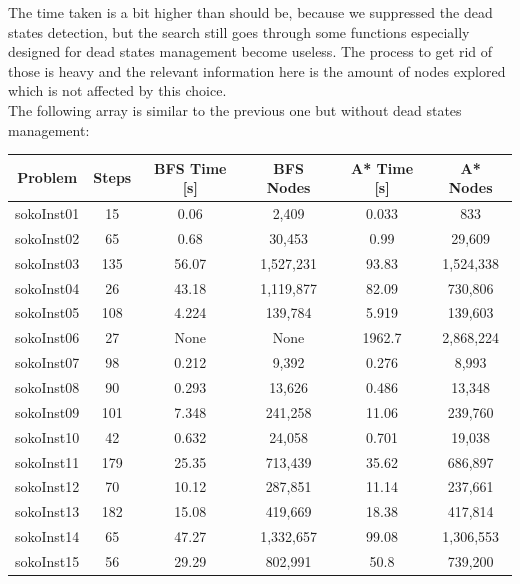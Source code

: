 \documentclass[a4paper,10pt]{article}
\begin{document}
			The time taken is a bit higher than should be, because we suppressed the dead states detection, but the search still goes through some functions especially designed for dead states management become useless. The process to get rid of those is heavy and the relevant information here is the amount of nodes explored which is not affected by this choice.\\
			The following array is similar to the previous one but without dead states management:\\
			
			\begin{tabular}{|c||c||c|c||c|c|}
				\hline 
				\textbf{Problem} & \textbf{Steps} & \textbf{BFS Time [s]} & \textbf{BFS Nodes} & \textbf{A* Time [s]} & \textbf{A* Nodes} \\ 
				\hline 
				sokoInst01 & 15 & 0.06 & 2,409 & 0.033 & 833 \\ 
				\hline
				sokoInst02 & 65 & 0.68 & 30,453 & 0.99 & 29,609 \\ 
				\hline
				sokoInst03 & 135 & 56.07 & 1,527,231 & 93.83 & 1,524,338 \\ 
				\hline
				sokoInst04 & 26 & 43.18 & 1,119,877 & 82.09 & 730,806 \\ 
				\hline
				sokoInst05 & 108 & 4.224 & 139,784 & 5.919 & 139,603 \\ 
				\hline
				sokoInst06 & 27 & None & None & 1962.7 & 2,868,224 \\ 
				\hline
				sokoInst07 & 98 & 0.212 & 9,392 & 0.276 & 8,993 \\ 
				\hline
				sokoInst08 & 90 & 0.293 & 13,626 & 0.486 & 13,348 \\ 
				\hline
				sokoInst09 & 101 & 7.348 & 241,258 & 11.06 & 239,760 \\ 
				\hline
				sokoInst10 & 42 & 0.632 & 24,058 & 0.701 & 19,038 \\ 
				\hline
				sokoInst11 & 179 & 25.35 & 713,439 & 35.62 & 686,897 \\ 
				\hline
				sokoInst12 & 70 & 10.12 & 287,851 & 11.14 & 237,661 \\ 
				\hline
				sokoInst13 & 182 & 15.08 & 419,669 & 18.38 & 417,814 \\ 
				\hline
				sokoInst14 & 65 & 47.27 & 1,332,657 & 99.08 & 1,306,553 \\ 
				\hline
				sokoInst15 & 56 & 29.29 & 802,991 & 50.8 & 739,200 \\ 
				\hline
			\end{tabular}\\
\end{document}
